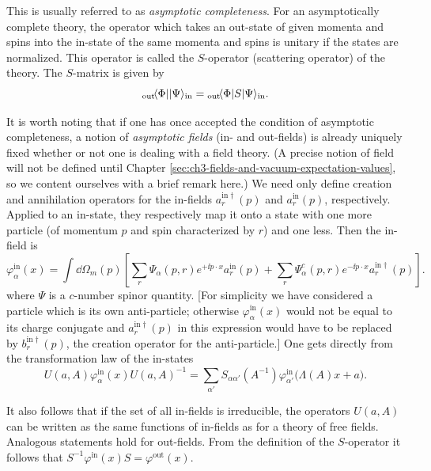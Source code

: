 This is usually referred to as \emph{asymptotic completeness}. For an
asymptotically complete theory, the operator which takes an out-state of given
momenta and spins into the in-state of the same momenta and spins is unitary if
the states are normalized. This operator is called the $S$-operator (scattering
operator) of the theory. The $S$-matrix is given by
\begin{equation*}
  {}_{\mathrm{out}}\!\langle \Phi\rvert\lvert \Psi\rangle_{\mathrm{in}}
  ={}_{\mathrm{out}}\!\langle \Phi\rvert S\lvert \Psi\rangle_{\mathrm{in}}.
\end{equation*}

It is worth noting that if one has once accepted the condition of asymptotic
completeness, a notion of \emph{asymptotic fields} (in- and out-fields) is already
uniquely fixed whether or not one is dealing with a field theory. (A precise
notion of field will not be defined until Chapter \ref{sec:ch3-fields-and-vacuum-expectation-values}, so we content ourselves
with a brief remark here.) We need only define creation and annihilation
operators for the in-fields $a_r^{\mathrm{in}\dagger}(p)$ and
$a_r^{\mathrm{in}}(p)$, respectively. Applied to an in-state, they respectively
map it onto a state with one more particle (of momentum $p$ and spin
characterized by $r$) and one less. Then the in-field is
\begin{equation*}
  \varphi^{\mathrm{in}}_\alpha(x)
  =\int\!\dd\Omega_m(p)\left[
    \sum_r\Psi_\alpha(p,r)e^{+\ii p\cdot x}a_r^{\mathrm{in}}(p)
    +\sum_r\Psi^c_\alpha(p,r)e^{-\ii p\cdot x}
      a_r^{\mathrm{in}\dagger}(p)\right].
\end{equation*}
where $\Psi$ is a $c$-number spinor quantity. [For simplicity we have
considered a particle which is its own anti-particle; otherwise
$\varphi^{\mathrm{in}}_\alpha(x)$ would not be equal to its charge conjugate
and $a_r^{\mathrm{in}\dagger}(p)$ in this expression would have to be replaced
by $b_r^{\mathrm{in}\dagger}(p)$, the creation operator for the anti-particle.]
One gets directly from the transformation law of the in-states
\begin{equation*}
  U(a,A)\varphi^{\mathrm{in}}_\alpha(x)U(a,A)^{-1}
  =\sum_{\alpha'}S_{\alpha\alpha'}(A^{-1})
    \varphi^{\mathrm{in}}_{\alpha'}\bigl(\Lambda(A)x+a\bigr).
\end{equation*}

It also follows that if the set of all in-fields is irreducible, the operators
$U(a,A)$ can be written as the same functions of in-fields as for a theory of
free fields. Analogous statements hold for out-fields. From the definition of
the $S$-operator it follows that $S^{-1}\varphi^{\mathrm{in}}(x)S
=\varphi^{\mathrm{out}}(x)$.

